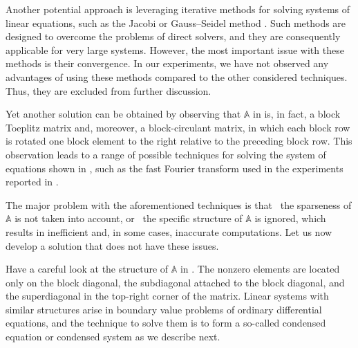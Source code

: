 Another potential approach is leveraging iterative methods for solving systems
of linear equations, such as the Jacobi or Gauss--Seidel method
\cite{press2007}. Such methods are designed to overcome the problems of direct
solvers, and they are consequently applicable for very large systems. However,
the most important issue with these methods is their convergence. In our
experiments, we have not observed any advantages of using these methods compared
to the other considered techniques. Thus, they are excluded from further
discussion.

Yet another solution can be obtained by observing that $\mathbb{A}$ in
 is, in fact, a block Toeplitz matrix and, moreover,
a block-circulant matrix, in which each block row is rotated one block element
to the right relative to the preceding block row. This observation leads to a
range of possible techniques for solving the system of equations shown in
, such as the fast Fourier transform
\cite{mazancourt1983} used in the experiments reported in
.

The major problem with the aforementioned techniques is that \one~the sparseness
of $\mathbb{A}$ is not taken into account, or \two~the specific structure of
$\mathbb{A}$ is ignored, which results in inefficient and, in some cases,
inaccurate computations. Let us now develop a solution that does not have these
issues.

Have a careful look at the structure of $\mathbb{A}$ in
. The nonzero elements are located only on the block
diagonal, the subdiagonal attached to the block diagonal, and the superdiagonal
in the top-right corner of the matrix. Linear systems with similar structures
arise in boundary value problems of ordinary differential equations, and the
technique to solve them is to form a so-called condensed equation or condensed
system \cite{stoer2002} as we describe next.

